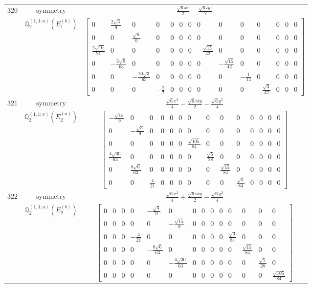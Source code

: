 \documentclass[fleqn,8pt,landscape]{jsarticle}
\begin{document}
\begin{longtable}{ccc}
$ 320 $ & $ \text{symmetry} $ & $ \frac{\sqrt{6} x z}{2} - \frac{\sqrt{6} i y z}{2} $ \\
$  $ & $ \mathbb{Q}_{2}^{(1,1;a)}(E_{1}^{(b)}) $ & $ \begin{bmatrix} 0 & \frac{2 \sqrt{3}}{9} & 0 & 0 & 0 & 0 & 0 & 0 & 0 & 0 & 0 & 0 & 0 & 0 \\ 0 & 0 & \frac{\sqrt{6}}{9} & 0 & 0 & 0 & 0 & 0 & 0 & 0 & 0 & 0 & 0 & 0 \\ \frac{2 \sqrt{10}}{21} & 0 & 0 & 0 & 0 & 0 & 0 & - \frac{\sqrt{15}}{42} & 0 & 0 & 0 & 0 & 0 & 0 \\ 0 & - \frac{2 \sqrt{6}}{63} & 0 & 0 & 0 & 0 & 0 & 0 & - \frac{\sqrt{15}}{42} & 0 & 0 & 0 & 0 & 0 \\ 0 & 0 & - \frac{10 \sqrt{3}}{63} & 0 & 0 & 0 & 0 & 0 & 0 & - \frac{1}{14} & 0 & 0 & 0 & 0 \\ 0 & 0 & 0 & - \frac{2}{7} & 0 & 0 & 0 & 0 & 0 & 0 & - \frac{\sqrt{3}}{42} & 0 & 0 & 0 \end{bmatrix} $ \\ \hline
$ 321 $ & $ \text{symmetry} $ & $ \frac{\sqrt{6} x^{2}}{4} - \frac{\sqrt{6} i x y}{2} - \frac{\sqrt{6} y^{2}}{4} $ \\
$  $ & $ \mathbb{Q}_{2}^{(1,1;a)}(E_{2}^{(a)}) $ & $ \begin{bmatrix} - \frac{\sqrt{15}}{9} & 0 & 0 & 0 & 0 & 0 & 0 & 0 & 0 & 0 & 0 & 0 & 0 & 0 \\ 0 & - \frac{\sqrt{3}}{9} & 0 & 0 & 0 & 0 & 0 & 0 & 0 & 0 & 0 & 0 & 0 & 0 \\ 0 & 0 & 0 & 0 & 0 & 0 & \frac{\sqrt{105}}{84} & 0 & 0 & 0 & 0 & 0 & 0 & 0 \\ \frac{4 \sqrt{30}}{63} & 0 & 0 & 0 & 0 & 0 & 0 & \frac{\sqrt{5}}{28} & 0 & 0 & 0 & 0 & 0 & 0 \\ 0 & \frac{8 \sqrt{6}}{63} & 0 & 0 & 0 & 0 & 0 & 0 & \frac{\sqrt{15}}{84} & 0 & 0 & 0 & 0 & 0 \\ 0 & 0 & \frac{4}{21} & 0 & 0 & 0 & 0 & 0 & 0 & \frac{\sqrt{3}}{84} & 0 & 0 & 0 & 0 \end{bmatrix} $ \\ \hline
$ 322 $ & $ \text{symmetry} $ & $ \frac{\sqrt{6} x^{2}}{4} + \frac{\sqrt{6} i x y}{2} - \frac{\sqrt{6} y^{2}}{4} $ \\
$  $ & $ \mathbb{Q}_{2}^{(1,1;a)}(E_{2}^{(b)}) $ & $ \begin{bmatrix} 0 & 0 & 0 & 0 & - \frac{\sqrt{3}}{9} & 0 & 0 & 0 & 0 & 0 & 0 & 0 & 0 & 0 \\ 0 & 0 & 0 & 0 & 0 & - \frac{\sqrt{15}}{9} & 0 & 0 & 0 & 0 & 0 & 0 & 0 & 0 \\ 0 & 0 & 0 & - \frac{4}{21} & 0 & 0 & 0 & 0 & 0 & 0 & \frac{\sqrt{3}}{84} & 0 & 0 & 0 \\ 0 & 0 & 0 & 0 & - \frac{8 \sqrt{6}}{63} & 0 & 0 & 0 & 0 & 0 & 0 & \frac{\sqrt{15}}{84} & 0 & 0 \\ 0 & 0 & 0 & 0 & 0 & - \frac{4 \sqrt{30}}{63} & 0 & 0 & 0 & 0 & 0 & 0 & \frac{\sqrt{5}}{28} & 0 \\ 0 & 0 & 0 & 0 & 0 & 0 & 0 & 0 & 0 & 0 & 0 & 0 & 0 & \frac{\sqrt{105}}{84} \end{bmatrix} $ \\ \hline

\end{longtable}
\end{document}
